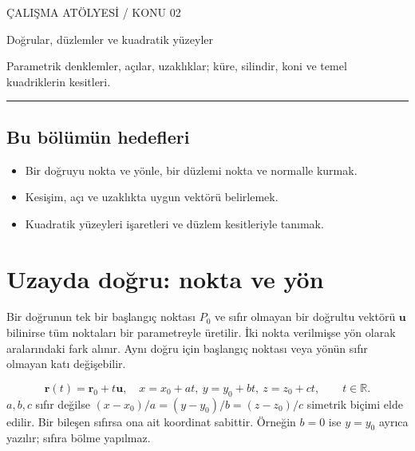 
{\sffamily\small\color{accent} ÇALIŞMA ATÖLYESİ / KONU 02\par}
\vspace{8mm}
{\Huge\sffamily\bfseries\raggedright{} Doğrular, düzlemler ve kuadratik yüzeyler\par}
\vspace{3mm}
{\large Parametrik denklemler, açılar, uzaklıklar; küre, silindir, koni ve temel kuadriklerin kesitleri.\par}
\vspace{4mm}\hrule\vspace{4mm}\subsection*{Bu bölümün hedefleri}\begin{itemize}
\item Bir doğruyu nokta ve yönle, bir düzlemi nokta ve normalle kurmak.
\item Kesişim, açı ve uzaklıkta uygun vektörü belirlemek.
\item Kuadratik yüzeyleri işaretleri ve düzlem kesitleriyle tanımak.\end{itemize}
{\small\tableofcontents}\clearpage
\section{Uzayda doğru: nokta ve yön}
Bir doğrunun tek bir başlangıç noktası \(P_0\) ve sıfır olmayan bir doğrultu vektörü \(\mathbf u\) bilinirse tüm noktaları bir parametreyle üretilir. İki nokta verilmişse yön olarak aralarındaki fark alınır. Aynı doğru için başlangıç noktası veya yönün sıfır olmayan katı değişebilir.


{\small\[
\mathbf r(t)=\mathbf r_0+t\mathbf u,\quad x=x_0+at,\ y=y_0+bt,\ z=z_0+ct,\qquad t\in\mathbb R.
\]}
\(a,b,c\) sıfır değilse \((x-x_0)/a=(y-y_0)/b=(z-z_0)/c\) simetrik biçimi elde edilir. Bir bileşen sıfırsa ona ait koordinat sabittir. Örneğin \(b=0\) ise \(y=y_0\) ayrıca yazılır; sıfıra bölme yapılmaz.

